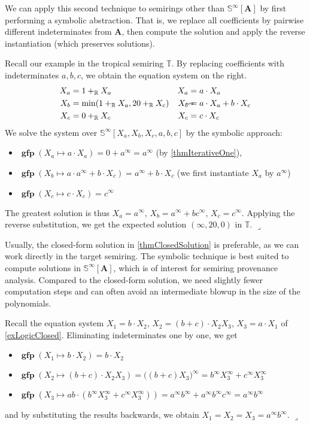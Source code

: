 \documentclass[english,runningheads,a4paper,envcountsame]{llncs}
\newenvironment{Example}{\example}{\hfill$\lrcorner$\endexample}
\DeclareMathOperator{\gfp}{\mathbf{gfp}}
\newcommand{\Sinf}{{\mathbb S}^{\infty}}
\newcommand{\Trop}{\mathbb{T}}
\newcommand{\RR}{\mathbb{R}}
\renewcommand{\AA}{{\bm A}}
\newcommand{\Rplus}{+_\RR}
\begin{document}
We can apply this second technique to semirings other than $\Sinf[\AA]$ by first performing a symbolic abstraction.
That is, we replace all coefficients by pairwise different indeterminates from $\AA$, then compute the solution and apply the reverse instantiation (which preserves solutions).

\begin{Example}
Recall our example in the tropical semiring $\Trop$.
By replacing coefficients with indeterminates $a,b,c$, we obtain the equation system on the right.
\begin{align*}
X_a &= 1 \Rplus X_a & X_a &= a \cdot X_a \\
X_b &= \min(1 \Rplus X_a, 20 \Rplus X_c) \mathrlap{\qquad\rightsquigarrow} & X_b &= a \cdot X_a + b \cdot X_c \\
X_c &= 0 \Rplus X_c & X_c &= c \cdot X_c
\end{align*}
We solve the system over $\Sinf[X_a,X_b,X_c,a,b,c]$ by the symbolic approach:
\begin{itemize}
\item
$\gfp(X_a \mapsto a \cdot X_a) = 0 + a^\infty = a^\infty$ \hfill (by \cref{thmIterativeOne}),
\item
$\gfp(X_b \mapsto a \cdot a^\infty + b \cdot X_c) = a^\infty + b \cdot X_c$ \hfill (we first instantiate $X_a$ by $a^\infty$)
\item $\gfp(X_c \mapsto c \cdot X_c) = c^\infty$
\end{itemize}
The greatest solution is thus $X_a = a^\infty$, $X_b = a^\infty + b c^\infty$, $X_c = c^\infty$.
Applying the reverse substitution, we get the expected solution $(\infty, 20, 0)$ in $\Trop$.
\end{Example}


Usually, the closed-form solution in \cref{thmClosedSolution} is preferable, as we can work directly in the target semiring.
The symbolic technique is best suited to compute solutions in $\Sinf[\AA]$, which is of interest for semiring provenance analysis.
Compared to the closed-form solution, we need slightly fewer computation steps and can often avoid an intermediate blowup in the size of the polynomials.


\begin{Example}
Recall the equation system $X_1 = b \cdot X_2$, $X_2 = (b+c) \cdot X_2 X_3$, $X_3 = a \cdot X_1$ of \cref{exLogicClosed}. Eliminating indeterminates one by one, we get
\begin{itemize}
\item $\gfp(X_1 \mapsto b \cdot X_2) = b \cdot X_2$
\item $\gfp(X_2 \mapsto (b+c) \cdot X_2 X_3) = \big((b+c)X_3\big)^\infty = b^\infty X_3^\infty + c^\infty X_3^\infty$
\item $\gfp(X_3 \mapsto ab \cdot (b^\infty X_3^\infty + c^\infty X_3^\infty)) = a^\infty b^\infty + a^\infty b^\infty c^\infty = a^\infty b^\infty$
\end{itemize}
and by substituting the results backwards, we obtain $X_1 = X_2 = X_3 = a^\infty b^\infty$.
\end{Example}
\end{document}

